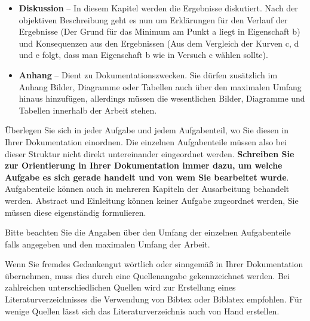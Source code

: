 \begin{itemize}
\item \textbf{Diskussion} -- In diesem Kapitel werden die Ergebnisse diskutiert. Nach der objektiven Beschreibung geht es nun um Erklärungen für den Verlauf der Ergebnisse (\glqq Der Grund für das Minimum am Punkt a liegt in Eigenschaft b\grqq) und Konsequenzen aus den Ergebnissen (\glqq Aus dem Vergleich der Kurven c, d und e folgt, dass man Eigenschaft b wie in Versuch c wählen sollte\grqq).
\item \textbf{Anhang} -- Dient zu Dokumentationszwecken. Sie dürfen zusätzlich im Anhang Bilder, Diagramme oder Tabellen auch über den maximalen Umfang hinaus hinzufügen, allerdings müssen die wesentlichen Bilder, Diagramme und Tabellen innerhalb der Arbeit stehen.
\end{itemize}

Überlegen Sie sich in jeder Aufgabe und jedem Aufgabenteil, wo Sie diesen in Ihrer Dokumentation einordnen. Die einzelnen Aufgabenteile müssen also bei dieser Struktur nicht direkt untereinander eingeordnet werden. \textbf{Schreiben Sie zur Orientierung in Ihrer Dokumentation immer dazu, um welche Aufgabe es sich gerade handelt und von wem Sie bearbeitet wurde}. Aufgabenteile können auch in mehreren Kapiteln der Ausarbeitung behandelt werden. Abstract und Einleitung können keiner Aufgabe zugeordnet werden, Sie müssen diese eigenständig formulieren.

Bitte beachten Sie die Angaben über den Umfang der einzelnen Aufgabenteile falls angegeben und den maximalen Umfang der Arbeit.

Wenn Sie fremdes Gedankengut wörtlich oder sinngemäß in Ihrer Dokumentation übernehmen, muss dies durch eine Quellenangabe gekennzeichnet werden. Bei zahlreichen unterschiedlichen Quellen wird zur Erstellung eines Literaturverzeichnisses die Verwendung von Bibtex oder Biblatex empfohlen. Für wenige Quellen lässt sich das Literaturverzeichnis auch von Hand erstellen.

